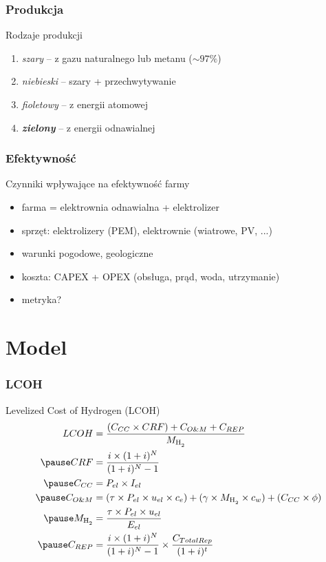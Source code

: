 \documentclass{beamer}
\newcommand{\HH}{\ce{H2}\xspace}
\begin{document}
\begin{frame}
	\frametitle{Produkcja \HH}
	Rodzaje produkcji \HH
	\begin{enumerate}
		\item \emph{szary} -- z gazu naturalnego lub metanu ($\sim 97\%$)
		\item \emph{niebieski} -- szary + przechwytywanie 
		\item \emph{fioletowy} -- z energii atomowej
		\item \textbf{\emph{zielony}} -- z energii odnawialnej
	\end{enumerate}
\end{frame}


\begin{frame}
	\frametitle{Efektywność}
	Czynniki wpływające na efektywność farmy \HH
	\begin{itemize}
		\item farma = elektrownia odnawialna + elektrolizer \HH
		\item sprzęt: elektrolizery (PEM), elektrownie (wiatrowe, PV, ...)
		\item warunki pogodowe, geologiczne
		\item koszta: CAPEX + OPEX (obsługa, prąd, woda, utrzymanie)
		\item metryka?
	\end{itemize}
\end{frame}

\section{Model}

\begin{frame}
	\frametitle{LCOH}
	Levelized Cost of Hydrogen (LCOH)
	\begin{align}
		LCOH     & = \frac{(C_{CC} \times CRF)
		+ C_{O\&M} + C_{REP}}{M_{\HH}} \nonumber                         \\
		\pause
		CRF      & =  \frac{i \times (1 + i)^N}{(1 + i)^N - 1} \nonumber \\
		\pause
		C_{CC}   & =  P_{el} \times I_{el} \nonumber                     \\
		\pause
		C_{O\&M} & =  (\tau \times P_{el} \times u_{el} \times c_e)
		+ (\gamma \times M_{\HH} \times c_w)
		+ (C_{CC} \times \phi) \nonumber                                 \\
		\pause
		M_{\HH}  & =  \frac{\tau \times P_{el}
		\times u_{el}}{E_{el}} \nonumber                                 \\
		\pause
		C_{REP}  & =  \frac{i \times (1 + i)^N}{(1 + i)^N - 1}
		\times \frac{C_{TotalRep}}{(1+i)^t} \nonumber
	\end{align}
\end{frame}
\end{document}
